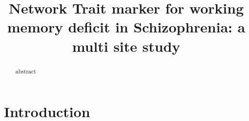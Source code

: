 \documentclass[preprint,authoryear,review,12pt]{elsarticle}
\begin{document}
\begin{frontmatter}

\title{Network Trait marker for working memory deficit in Schizophrenia: a multi site study
}



%






\begin{abstract} 
abstract
\end{abstract}

\begin{keyword}
\end{keyword}

\end{frontmatter}
%
%
\newpage





\section*{Introduction}
\end{document}
